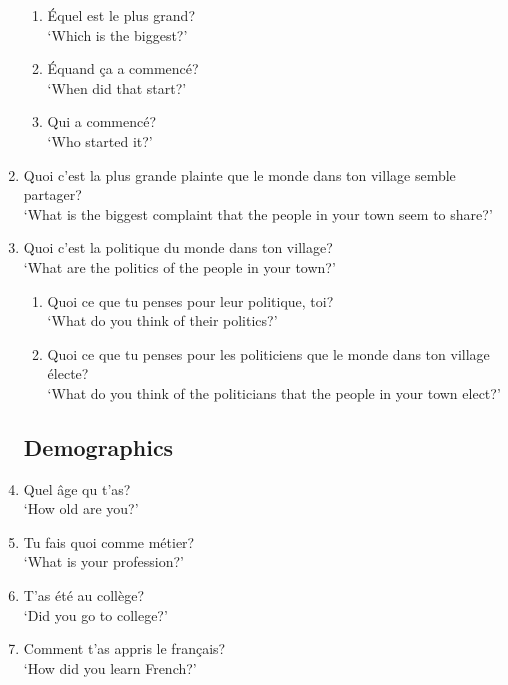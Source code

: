 \begin{enumerate}
            \begin{enumerate}
                \item Équel est le plus grand?\\
                      `Which is the biggest?'
                \item Équand ça a commencé?\\
                      `When did that start?'
                \item Qui a commencé?\\
                      `Who started it?'
            \end{enumerate}
        \item Quoi c'est la plus grande plainte que le monde dans ton village semble partager?\\
              `What is the biggest complaint that the people in your town seem to share?'
        \item Quoi c'est la politique du monde dans ton village?\\
              `What are the politics of the people in your town?'
        \begin{enumerate}
            \item Quoi ce que tu penses pour leur politique, toi?\\
                  `What do you think of their politics?'
            \item Quoi ce que tu penses pour les politiciens que le monde dans ton village électe?\\
                  `What do you think of the politicians that the people in your town elect?'
        \end{enumerate}
    \subsection{Demographics}
    \item Quel âge qu t'as?\\
          `How old are you?'
    \item Tu fais quoi comme métier?\\
          `What is your profession?'
    \item T'as été au collège?\\
          `Did you go to college?'
    \item Comment t'as appris le français?\\
          `How did you learn French?'
\end{enumerate}
